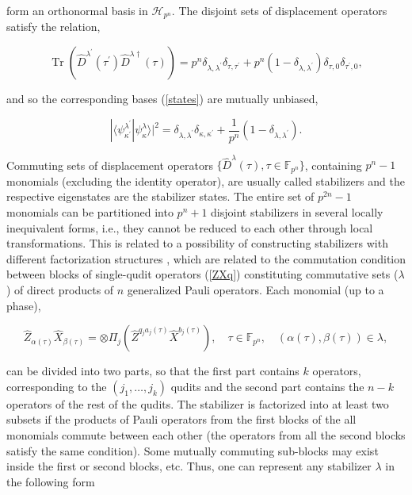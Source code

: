 \documentclass[quantumrep,article,submit,pdftex,moreauthors]{Definitions/mdpi}
\DeclareMathOperator{\Tr}{Tr}
\begin{document}
form an orthonormal basis in $\mathcal{H}_{p^{n}}$. The disjoint sets of
displacement operators satisfy the relation,

\begin{equation*}
  \Tr\left(
    \hat{D}^{\lambda^{\prime}}(\tau^{\prime})\hat{D}^{\lambda\dagger}(\tau)
  \right)
  = p^{n}\delta_{\lambda,\lambda^{\prime}}\delta_{\tau,\tau^{\prime }} +
  p^{n}(1 - \delta_{\lambda,\lambda^{\prime}}) \delta_{\tau,0}
  \delta_{\tau^{\prime},0},
\end{equation*}

and so the corresponding bases (\ref{states}) are mutually unbiased,

\begin{equation}
  |\langle\psi_{\kappa^{\prime}}^{\lambda^{\prime}}
  |\psi_{\kappa}^{\lambda}\rangle|^{2}
  = \delta_{\lambda,\lambda^{\prime}} \delta_{\kappa,\kappa^{\prime}} +
  \frac{1}{p^{n}} (1-\delta_{\lambda,\lambda^{\prime}}).
  \label{UB}
\end{equation}

Commuting sets of displacement operators $\{\hat{D}^{\lambda }(\tau ),\tau
\in \mathbb{F}_{p^{n}}\}$, containing $p^{n}-1$ monomials (excluding the
identity operator), are usually called stabilizers and the respective
eigenstates are the stabilizer states. The entire set of $p^{2n}-1$
monomials can be partitioned into $p^{n}+1$ disjoint stabilizers in several
locally inequivalent forms, i.e., they cannot be reduced to each other
through local transformations. This is related to a possibility of
constructing stabilizers with different factorization structures
\cite{factor1,factor2}, which are related to the commutation condition between
blocks of single-qudit operators (\ref{ZXq}) constituting commutative sets
($\lambda $) of direct products of $n$ generalized Pauli operators. Each
monomial (up to a phase), 

\begin{equation*}
  \hat{Z}_{\alpha(\tau)}\hat{X}_{\beta(\tau)}
  = \otimes \Pi_{j}\left(
    \hat{Z}^{q_{j}a_{j}(\tau)}\hat{X}^{b_{j}(\tau)}
  \right),
  \quad \tau \in \mathbb{F}_{p^{n}},
  \quad \left(\alpha(\tau),\beta(\tau)\right)
  \in \lambda,
\end{equation*}

can be divided into two parts, so that the first part contains $k$
operators, corresponding to the $(j_{1},\ldots ,j_{k})$ qudits and the
second part contains the $n-k$ operators of the rest of the qudits. The
stabilizer is factorized into at least two subsets if the products of Pauli
operators from the first blocks of the all monomials commute between each other
(the operators from all the second blocks satisfy the same condition). Some
mutually commuting sub-blocks may exist inside the first or second blocks, etc.
Thus, one can represent any stabilizer $\lambda $ in the following form 
\end{document}
